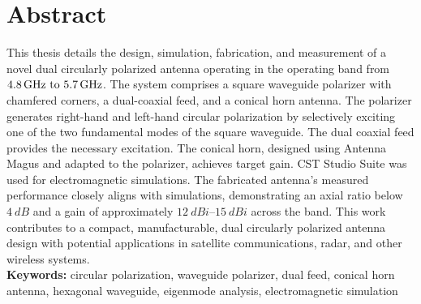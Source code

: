 \clearpage
\chapter*{Abstract}
This thesis details the design, simulation, fabrication, and measurement of a novel dual circularly polarized antenna operating in the operating band from $\frequencyrange$. The system comprises a square waveguide polarizer with chamfered corners, a dual-coaxial feed, and a conical horn antenna. The polarizer generates right-hand and left-hand circular polarization by selectively exciting one of the two fundamental modes of the square waveguide. The dual coaxial feed provides the necessary excitation. The conical horn, designed using Antenna Magus and adapted to the polarizer, achieves target gain. CST Studio Suite was used for electromagnetic simulations. The fabricated antenna's measured performance closely aligns with simulations, demonstrating an axial ratio below $\qty{4}{dB}$ and a gain of approximately $\qtyrange{12}{15}{dBi}$ across the band. This work contributes to a compact, manufacturable, dual circularly polarized antenna design with potential applications in satellite communications, radar, and other wireless systems.\\[0.25cm]
\textbf{Keywords:} circular polarization, waveguide polarizer, dual feed, conical horn antenna, hexagonal waveguide, eigenmode analysis, electromagnetic simulation
\clearpage